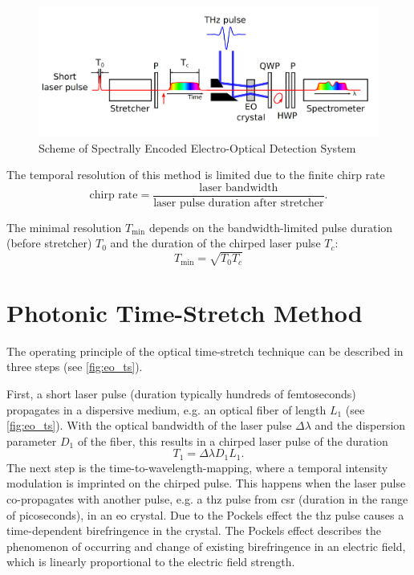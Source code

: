 \begin{figure}[tbh]
	\centering
	\includegraphics[width = \textwidth]{chap/02-theory/img/spectral_eo}
	\caption{Scheme of Spectrally Encoded Electro-Optical Detection System \cite{roussel2014}}
	\label{fig:spectral_eo}
\end{figure}

The temporal resolution of this method is limited due to the finite chirp rate
\begin{equation}
	\text{chirp rate} = \frac{\text{laser bandwidth}}{\text{laser pulse duration after stretcher}}.
\end{equation}

The minimal resolution $T_{\text{min}}$ depends on the bandwidth-limited pulse duration (before stretcher) $T_0$ and the duration of the chirped laser pulse $T_c$:
\begin{equation}
	T_{\text{min}} = \sqrt{T_0 T_c}
\end{equation}


\section{Photonic Time-Stretch Method}
The operating principle of the optical time-stretch technique can be described in three steps (see \autoref{fig:eo_ts}).

First, a short laser pulse (duration typically hundreds of femtoseconds) propagates in a dispersive medium, e.g. an optical fiber of length $L_1$ (see \autoref{fig:eo_ts}).
With the optical bandwidth of the laser pulse $\Delta \lambda$ and the dispersion parameter $D_1$ of the fiber, this results in a chirped laser pulse of the duration
\begin{equation}
	T_1 = \Delta \lambda D_1 L_1.
\end{equation}
The next step is the time-to-wavelength-mapping, where a temporal intensity modulation is imprinted on the chirped pulse.
This happens when the laser pulse co-propagates with another pulse, e.g. a \gls{thz} pulse from \gls{csr} (duration in the range of picoseconds), in an \gls{eo} crystal. 
Due to the Pockels effect the \gls{thz} pulse causes a time-dependent birefringence in the crystal. 
The Pockels effect describes the phenomenon of occurring and change of existing birefringence in an electric field, which is linearly proportional to the electric field strength. \cite{pockels} 

